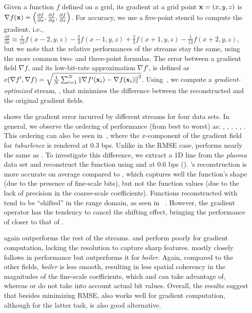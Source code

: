 Given a function $f$ defined on a grid, its gradient at a grid point \mbox{$\x = (x,y,z)$} is
$\nabla f(\x) = \left(\frac{\partial f}{\partial x}, \frac{\partial f}{\partial y}, \frac{\partial
f}{\partial z}\right)$. For accuracy, we use a five-point stencil to compute the gradient, i.e.,
$\frac{\partial f}{\partial x} \approx \frac{1}{12}f(x-2,y,z) - \frac{2}{3}f(x-1,y,z) +
\frac{2}{3}f(x+1,y,z) - \frac{1}{12}f(x+2,y,z)$, but we note that the relative performances of the
streams stay the same, using the more common two- and three-point formulas. The error between a
gradient field $\nabla f$, and its low-bit-rate approximation $\nabla f'$, is defined as
$\err(\nabla f', \nabla f) = \sqrt{\frac{1}{N} \sum_{i=1}^{N}{\norm{\nabla f'(\x_i)-\nabla
f(\x_i)}^2}}$. Using~, we compute a \emph{gradient-optimized} stream, \sgop, that
minimizes the difference between the reconstructed and the original gradient fields.

 shows the gradient error incurred by different streams for four
data sets. In general, we observe the ordering of performance (from best to worst) as: \sgop, \sgsg,
\sbit, \swav, \smag, \slvl. This ordering can also be seen in~,
where the $x$-component of the gradient field for \emph{tuburlence} is rendered at 0.3 bps. Unlike
in the RMSE case, \sbit performs nearly the same as \swav. To investigate this difference, we
extract a 1D line from the \emph{plasma} data set and reconstruct the function using \sbit and \swav
at 0.6 bps (). \swav's reconstruction is more accurate
on average compared to \sbit, which captures well the function's shape (due to the presence of
fine-scale bits), but not the function values (due to the lack of precision in the coarse-scale
coefficients). Functions reconstructed with \sbit tend to be ``shifted'' in the range domain, as
seen in ~. However, the gradient operator has the
tendency to cancel the shifting effect, bringing the performance of \sbit closer to that of \swav.

\sgop again outperforms the rest of the streams. \slvl and \smag perform poorly for gradient
computation, lacking the resolution to capture sharp features. \sgsg mostly closely follows \sbit in
performance but outperforms it for \emph{boiler}. Again, compared to the other fields, \emph{boiler}
is less smooth, resulting in less spatial coherency in the magnitudes of the fine-scale
coefficients, which \sgop and \sgsg can take advantage of, whereas \swav or \sbit do not take into
account actual bit values. Overall, the results suggest that besides minimizing RMSE, \swav also
works well for gradient computation, although for the latter task, \sbit is also good alternative.

